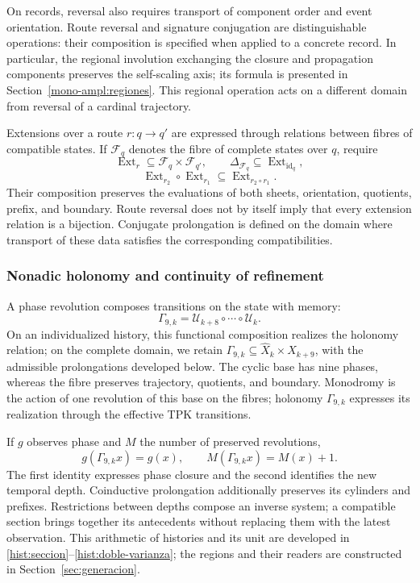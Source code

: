 On records, reversal also requires transport of component order
and event orientation. Route reversal
and signature conjugation are distinguishable operations: their
composition is specified when applied to a concrete record. In
particular, the regional involution exchanging the closure
and propagation components preserves the self-scaling axis; its formula is
presented in Section~\ref{mono-ampl:regiones}. This regional operation
acts on a different domain from reversal of a cardinal trajectory.

Extensions over a route \(r:q\to q'\) are expressed through
relations between fibres of compatible states. If \(\mathcal F_q\)
denotes the fibre of complete states over \(q\), require
\[
 \operatorname{Ext}_r\subseteq\mathcal F_q\times\mathcal F_{q'},
 \qquad \Delta_{\mathcal F_q}\subseteq
        \operatorname{Ext}_{\operatorname{id}_q},
\]
\[
 \operatorname{Ext}_{r_2}\circ\operatorname{Ext}_{r_1}
       \subseteq\operatorname{Ext}_{r_2\circ r_1}.
\]
Their composition preserves the evaluations of both sheets, orientation,
quotients, prefix, and boundary. Route reversal does not
by itself imply that every extension relation is a bijection.
Conjugate prolongation is defined on the domain where transport of
these data satisfies the corresponding compatibilities.

\subsubsection{Nonadic holonomy and continuity of refinement}
\label{tpk-int:holonomia}

A phase revolution composes transitions on the state with memory:
\begin{equation}
 \Gamma_{9,k}=\mathcal U_{k+8}\circ\cdots\circ\mathcal U_k.
 \label{tpk-int:gamma}
\end{equation}
On an individualized history, this functional composition realizes
the holonomy relation; on the complete domain, we retain
\(\Gamma_{9,k}\subseteq\widehat X_k\times\widehat X_{k+9}\),
with the admissible prolongations developed below.
The cyclic base has nine phases, whereas
the fibre preserves trajectory, quotients, and boundary.
Monodromy is the action of one revolution of this base on the fibres;
holonomy \(\Gamma_{9,k}\) expresses its realization through the effective
TPK transitions.

If \(g\) observes phase and \(M\) the number of preserved revolutions,
\[
 g(\Gamma_{9,k}x)=g(x),\qquad M(\Gamma_{9,k}x)=M(x)+1.
\]
The first identity expresses phase closure and the second identifies
the new temporal depth. Coinductive prolongation additionally preserves
its cylinders and prefixes. Restrictions between depths
compose an inverse system; a compatible section brings together its
antecedents without replacing them with the latest observation. This
arithmetic of histories and its unit are developed in
\ref{hist:seccion}--\ref{hist:doble-varianza}; the regions and their
readers are constructed in Section~\ref{sec:generacion}.

